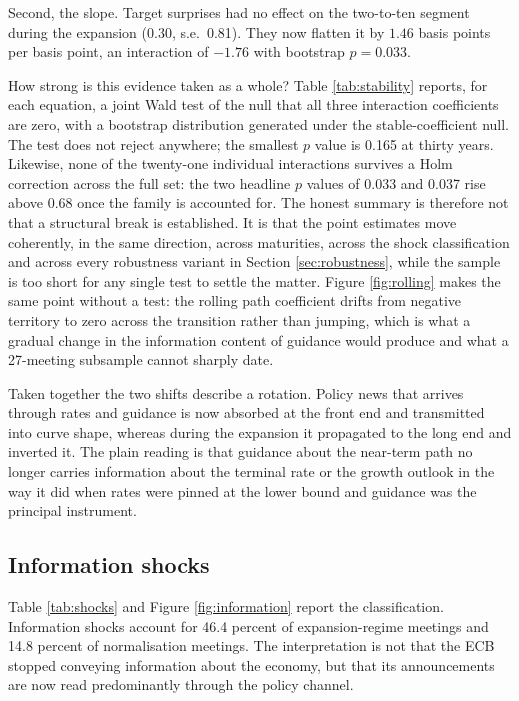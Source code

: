 \documentclass[11pt]{article}
\begin{document}
Second, the slope. Target surprises had no effect on the two-to-ten segment
during the expansion ($0.30$, s.e.\ 0.81). They now flatten it by $1.46$ basis
points per basis point, an interaction of $-1.76$ with bootstrap $p = 0.033$.

How strong is this evidence taken as a whole? Table \ref{tab:stability}
reports, for each equation, a joint Wald test of the null that all three
interaction coefficients are zero, with a bootstrap distribution generated under
the stable-coefficient null. The test does not reject anywhere; the smallest
$p$ value is 0.165 at thirty years. Likewise, none of the twenty-one individual
interactions survives a Holm correction across the full set: the two headline
$p$ values of 0.033 and 0.037 rise above 0.68 once the family is accounted for.
The honest summary is therefore not that a structural break is established.
It is that the point estimates move coherently, in the same direction, across
maturities, across the shock classification and across every robustness variant
in Section \ref{sec:robustness}, while the sample is too short for any single
test to settle the matter. Figure \ref{fig:rolling} makes the same point
without a test: the rolling path coefficient drifts from negative territory to
zero across the transition rather than jumping, which is what a gradual change
in the information content of guidance would produce and what a 27-meeting
subsample cannot sharply date.

Taken together the two shifts describe a rotation. Policy news that arrives
through rates and guidance is now absorbed at the front end and transmitted into
curve shape, whereas during the expansion it propagated to the long end and
inverted it. The plain reading is that guidance about the near-term path no
longer carries information about the terminal rate or the growth outlook in the
way it did when rates were pinned at the lower bound and guidance was the
principal instrument.

\subsection{Information shocks}

Table \ref{tab:shocks} and Figure \ref{fig:information} report the
classification. Information shocks account for 46.4 percent of expansion-regime
meetings and 14.8 percent of normalisation meetings. The interpretation is not
that the ECB stopped conveying information about the economy, but that its
announcements are now read predominantly through the policy channel.
\end{document}
